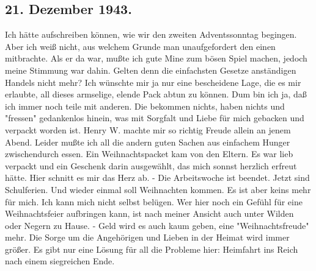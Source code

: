 \subsection{21. Dezember 1943.}

Ich h\"{a}tte aufschreiben k\"{o}nnen, wie wir den zweiten Adventssonntag begingen.
Aber ich wei{\ss} nicht, aus welchem Grunde man unaufgefordert den einen mitbrachte.
Als er da war, mu{\ss}te ich gute Mine zum b\"{o}sen Spiel machen, jedoch meine Stimmung war dahin.
Gelten denn die einfachsten Gesetze anst\"{a}ndigen Handels nicht mehr?
Ich w\"{u}nschte mir ja nur eine bescheidene Lage, die es mir erlaubte, all dieses armselige, elende Pack abtun zu k\"{o}nnen.
Dum bin ich ja, da{\ss} ich immer noch teile mit anderen.
Die bekommen nichts, haben nichts und "fressen" gedankenlos hinein, was mit Sorgfalt und Liebe f\"{u}r mich gebacken und verpackt worden ist.
Henry W. machte mir so richtig Freude allein an jenem Abend.
Leider mu{\ss}te ich all die andern guten Sachen aus einfachem Hunger zwischendurch essen.
Ein Weihnachtspacket kam von den Eltern.
Es war lieb verpackt und ein Geschenk darin ausgew\"{a}hlt, das mich sonnst herzlich erfreut h\"{a}tte.
Hier schnitt es mir das Herz ab.
- Die Arbeitswoche ist beendet.
Jetzt sind Schulferien.
Und wieder einmal soll Weihnachten kommen.
Es ist aber keins mehr f\"{u}r mich.
Ich kann mich nicht selbst bel\"{u}gen.
Wer hier noch ein Gef\"{u}hl f\"{u}r eine Weihnachtsfeier aufbringen kann, ist nach meiner Ansicht auch unter Wilden oder Negern zu Hause.
- Geld wird es auch kaum geben, eine "Weihnachtsfreude" mehr.
Die Sorge um die Angeh\"{o}rigen und Lieben in der Heimat wird immer gr\"{o}{\ss}er.
Es gibt nur eine L\"{o}sung f\"{u}r all die Probleme hier: Heimfahrt ins Reich nach einem siegreichen Ende.

\clearpage
